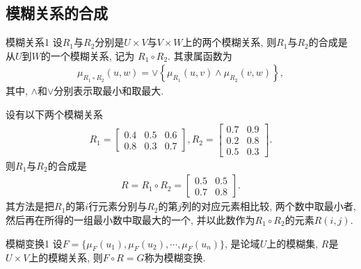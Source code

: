 \subsection{模糊关系的合成}
\begin{mydef}{模糊关系}{1}
    设$R_1$与$R_2$分别是$U\times V$与$V\times W$上的两个模糊关系, 则$R_1$与$R_2$的合成是从$U$到$W$的一个模糊关系, 记为   $R_1\circ R_2$. 其隶属函数为
\begin{align}
  \mu_{R_{1}\circ R_{2}}(u, w)=\vee\left\{\mu_{R_{1}}(u, v) \wedge \mu_{R_{2}}(v, w)\right\},
\end{align}
其中, $\wedge$和$\vee$分别表示取最小和取最大.
\end{mydef}

\begin{example}
设有以下两个模糊关系
\begin{align*}
    R_{1}=\left[\begin{array}{ccc}{0.4} & {0.5} & {0.6} \\
    {0.8} & {0.3} & {0.7}
    \end{array}\right],
    R_{2}=\left[\begin{array}{cc}{0.7} & {0.9} \\
    {0.2} & {0.8} \\
    {0.5} & {0.3}
    \end{array}\right].
\end{align*}
则$R_1$与$R_2$的合成是
\begin{align}
    R=R_{1} \circ R_{2}=\left[
    \begin{array}{ll}
    {0.5} & {0.5} \\
    {0.7} & {0.8}
    \end{array}\right].
\end{align}
其方法是把$R_1$的第$i$行元素分别与$R_2$的第$j$列的对应元素相比较, 两个数中取最小者, 然后再在所得的一组最小数中取最大的一个, 并以此数作为$R_1\circ R_2$的元素$R(i,j)$.
\end{example}
\begin{mydef}{模糊变换}{1}
    设$F=\{\mu_F(u_1),\mu_F(u_2),\cdots, \mu_F(u_n)\}$, 是论域$U$上的模糊集, $R$是$U\times V$上的模糊关系, 则$F\circ R=G$称为模糊变换.
\end{mydef}
